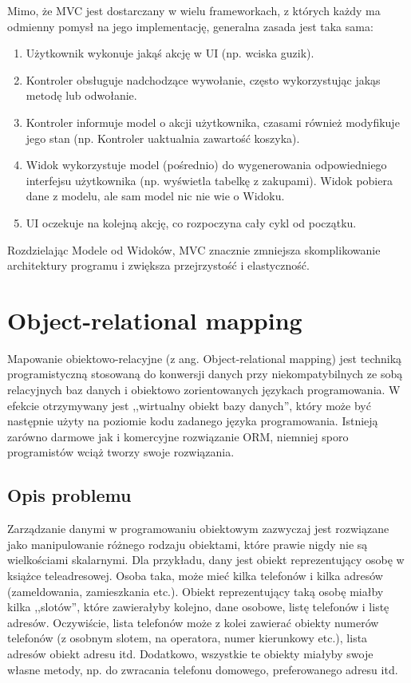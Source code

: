 \documentclass[a4paper,12pt,oneside]{report}
\begin{document}
Mimo, że MVC jest dostarczany w wielu frameworkach, z których każdy ma odmienny pomysł na jego implementację, generalna zasada jest taka sama:
\begin{enumerate}
  \item Użytkownik wykonuje jakąś akcję w UI (np. wciska guzik).
  \item Kontroler obsługuje nadchodzące wywołanie, często wykorzystując jakąs metodę lub odwołanie.
  \item Kontroler informuje model o akcji użytkownika, czasami również modyfikuje jego stan (np. Kontroler uaktualnia zawartość koszyka).
  \item Widok wykorzystuje model (pośrednio) do wygenerowania odpowiedniego interfejsu użytkownika (np. wyświetla tabelkę z zakupami). Widok pobiera dane z modelu, ale sam model nic nie wie o Widoku.
  \item UI oczekuje na kolejną akcję, co rozpoczyna cały cykl od początku.
\end{enumerate}

Rozdzielając Modele od Widoków, MVC znacznie zmniejsza skomplikowanie architektury programu i zwiększa przejrzystość i elastyczność.

\section{Object-relational mapping}
\label{sec:orm}
Mapowanie obiektowo-relacyjne (z ang. Object-relational mapping) jest techniką programistyczną stosowaną do konwersji danych przy niekompatybilnych ze sobą relacyjnych baz danych i obiektowo zorientowanych językach programowania. W efekcie otrzymywany jest ,,wirtualny obiekt bazy danych'', który może być następnie użyty na poziomie kodu zadanego języka programowania. Istnieją zarówno darmowe jak i komercyjne rozwiązanie ORM, niemniej sporo programistów wciąż tworzy swoje rozwiązania.

\subsection{Opis problemu}
\label{subsec:orm-problem}
Zarządzanie danymi w programowaniu obiektowym zazwyczaj jest rozwiązane jako manipulowanie różnego rodzaju obiektami, które prawie nigdy nie są wielkościami skalarnymi. Dla przykładu, dany jest obiekt reprezentujący osobę w książce teleadresowej. Osoba taka, może mieć kilka telefonów i kilka adresów (zameldowania, zamieszkania etc.). Obiekt reprezentujący taką osobę miałby kilka ,,slotów'', które zawierałyby kolejno, dane osobowe, listę telefonów i listę adresów. Oczywiście, lista telefonów może z kolei zawierać obiekty numerów telefonów (z osobnym slotem, na operatora, numer kierunkowy etc.), lista adresów obiekt adresu itd. Dodatkowo, wszystkie te obiekty miałyby swoje własne metody, np. do zwracania telefonu domowego, preferowanego adresu itd.
\end{document}
